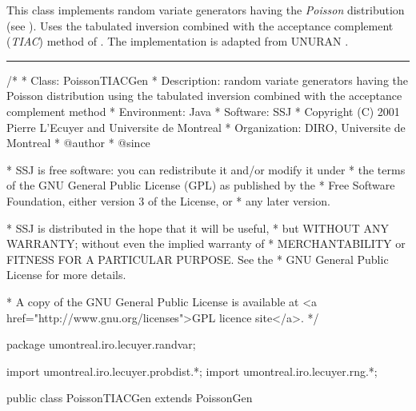 
This class implements random variate generators having the {\em Poisson\/} 
distribution (see ). 
Uses the tabulated inversion combined with the acceptance complement 
({\em TIAC\/}) method of \cite{rAHR82b}.
The implementation is adapted from UNURAN \cite{iLEY02a}. 


\bigskip\hrule

\begin{code}
\begin{hide}
/*
 * Class:        PoissonTIACGen
 * Description:  random variate generators having the Poisson distribution 
                 using the tabulated inversion combined with the acceptance
                 complement method
 * Environment:  Java
 * Software:     SSJ 
 * Copyright (C) 2001  Pierre L'Ecuyer and Universite de Montreal
 * Organization: DIRO, Universite de Montreal
 * @author       
 * @since

 * SSJ is free software: you can redistribute it and/or modify it under
 * the terms of the GNU General Public License (GPL) as published by the
 * Free Software Foundation, either version 3 of the License, or
 * any later version.

 * SSJ is distributed in the hope that it will be useful,
 * but WITHOUT ANY WARRANTY; without even the implied warranty of
 * MERCHANTABILITY or FITNESS FOR A PARTICULAR PURPOSE.  See the
 * GNU General Public License for more details.

 * A copy of the GNU General Public License is available at
   <a href="http://www.gnu.org/licenses">GPL licence site</a>.
 */
\end{hide}
package umontreal.iro.lecuyer.randvar;\begin{hide}
import umontreal.iro.lecuyer.probdist.*;
import umontreal.iro.lecuyer.rng.*;\end{hide}
   
public class PoissonTIACGen extends PoissonGen \begin{hide} {
 
   private double[] pp    = new double[36];
   private int[]    llref = {0};
   private static double[] staticPP    = new double[36];
   private static int[]    staticllref = {0};
   // Used by TIAC, avoid creating a table upon each call.
\end{hide}
\end{code}

